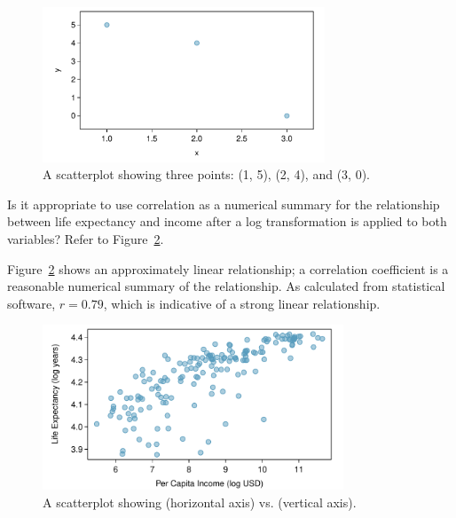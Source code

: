 \begin{figure}[h]
	\centering
	\includegraphics[width=0.75\textwidth]
	{ch_intro_to_data_oi_biostat/figures/corCalcSimple/corCalcSimple.pdf}
	\caption{A scatterplot showing three points: (1, 5), (2, 4), and (3, 0).} 
	\label{fig:corCalcSimple}
\end{figure}

\textD{\newpage}

\begin{examplewrap}
\begin{nexample}{Is it appropriate to use correlation as a numerical summary for the relationship between life expectancy and income after a log transformation is applied to both variables? Refer to Figure~\ref{incomeLifeExpectancyLog}.}
	
Figure~\ref{incomeLifeExpectancyLog} shows an approximately linear relationship; a correlation coefficient is a reasonable numerical summary of the relationship. As calculated from statistical software, $r = 0.79$, which is indicative of a strong linear relationship.
\end{nexample}
\end{examplewrap}

\begin{figure}[h]
	\centering
	\includegraphics[width=0.8\textwidth]
	{ch_intro_to_data_oi_biostat/figures/wdiIncomeLifeExpectancyLog/wdiIncomeLifeExpectancyLog.pdf}
	\caption{A scatterplot showing  (horizontal axis) vs.   (vertical axis).} 
	\label{incomeLifeExpectancyLog}
\end{figure}

